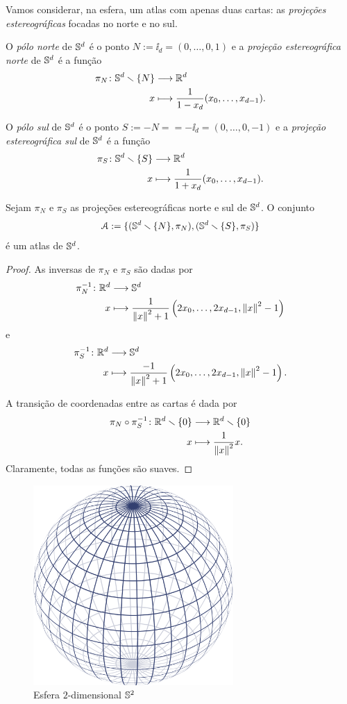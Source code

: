 Vamos considerar, na esfera, um atlas com apenas duas cartas: as \emph{projeções estereográficas} focadas no norte e no sul.

\begin{definition}
O \emph{pólo norte} de $\S^d$ é o ponto $N := \ii_d = (0,\ldots,0,1)$ e a \emph{projeção estereográfica norte} de $\S^d$ é a função
	\begin{align*}
	\func{\pi_N}{\S^d \setminus\{N\}}{\R^d}{x}{\frac{1}{1-x_d}(x_0,\ldots,x_{d-1})}.
	\end{align*}

O \emph{pólo sul} de $\S^d$ é o ponto $S := -N = = -\ii_d = (0,\ldots,0,-1)$ e a \emph{projeção estereográfica sul} de $\S^d$ é a função
	\begin{align*}
	\func{\pi_S}{\S^d \setminus\{S\}}{\R^d}{x}{\frac{1}{1+x_d}(x_0,\ldots,x_{d-1})}.
	\end{align*}
\end{definition}

\begin{proposition}
Sejam $\pi_N$ e $\pi_S$ as projeções estereográficas norte e sul de $\S^d$. O conjunto
	\begin{equation*}
	\atlas := \{(\S^d \setminus\{N\},\pi_N),(\S^d \setminus\{S\},\pi_S)\}
	\end{equation*}
é um atlas de $\S^d$.
\end{proposition}
\begin{proof}
As inversas de $\pi_N$ e $\pi_S$ são dadas por
	\begin{align*}
	\func{\pi_N\inv}{\R^d}{\S^d}{x}{\frac{1}{\nor{x}^2 + 1}\left(2x_0,\ldots,2x_{d-1},\nor{x}^2 - 1\right)}
	\end{align*}
e
	\begin{align*}
	\func{\pi_S\inv}{\R^d}{\S^d}{x}{\frac{-1}{\nor{x}^2+1}\left(2x_0,\ldots,2x_{d-1},\nor{x}^2-1\right)}.
	\end{align*}

A transição de coordenadas entre as cartas é dada por
	\begin{align*}
	\func{\pi_N \circ \pi_S\inv}{\R^d \setminus\{0\}}{\R^d \setminus\{0\}}{x}{\frac{1}{\nor{x}^2}x}.
	\end{align*}
Claramente, todas as funções são suaves.
\end{proof}

\begin{figure}
\centering
\includegraphics[width=3in]{./imagens/esfera}
\caption{Esfera $2$-dimensional \ensuremath{\S^2}}
\end{figure}

